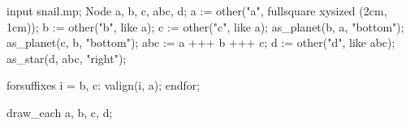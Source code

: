 \startMPpage
input snail.mp;
Node a, b, c, abc, d;
a := other("a", fullsquare xysized (2cm, 1cm));
b := other("b", like a);
c := other("c", like a);
as_planet(b, a, "bottom"); as_planet(c, b, "bottom");
abc := a +++ b +++ c;
d := other("d", like abc);
as_star(d, abc, "right");

forsuffixes i = b, c: valign(i, a); endfor;

draw_each a, b, c, d;
\stopMPpage
